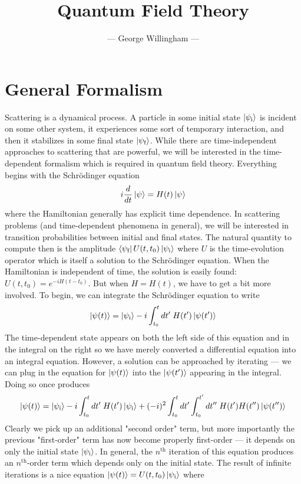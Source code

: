 \documentclass[onecolumn]{gwclass}
\title{Quantum Field Theory}
\author{--- George Willingham ---}
\date{}
\renewcommand{\t}[1]{\text{#1}}
\begin{document}
\maketitle

\tableofcontents 

\section{General Formalism}
Scattering is a dynamical process. A particle in some initial state $\ket{\psi_\t{i}}$ is incident on some other system, it experiences some sort of temporary interaction, and then it stabilizes in some final state $\ket{\psi_\t{f}}$. While there are time-independent approaches to scattering that are powerful, we will be interested in the time-dependent formalism which is required in quantum field theory. Everything begins with the Schr\"odinger equation
$$ i\frac{d}{dt}\ket{\psi} = H(t)\ket{\psi} $$
where the Hamiltonian generally has explicit time dependence. In scattering problems (and time-dependent phenomena in general), we will be interested in transition probabilities between initial and final states. The natural quantity to compute then is the amplitude $\bra{\psi_\t{f}}U(t, t_0)\ket{\psi_\t{i}}$ where $U$ is the time-evolution operator which is itself a solution to the Schr\"odinger equation. When the Hamiltonian is independent of time, the solution is easily found: $U(t, t_0) = e^{-i H (t-t_0)}$. But when $H=H(t)$, we have to get a bit more involved. To begin, we can integrate the Schr\"odinger equation to write
$$ \ket{\psi(t)} = \ket{\psi_\t{i}} - i \int_{t_0}^{t} dt'\;H(t')\ket{\psi(t')} $$
The time-dependent state appears on both the left side of this equation and in the integral on the right so we have merely converted a differential equation into an integral equation. However, a solution can be approached by iterating --- we can plug in the equation for $\ket{\psi(t)}$ into the $\ket{\psi(t')}$ appearing in the integral. Doing so once produces
$$ \ket{\psi(t)} = \ket{\psi_\t{i}} - i\int_{t_0}^t dt'\;H(t')\ket{\psi_\t{i}} +  (-i)^2 \int_{t_0}^t dt'\int_{t_0}^{t'}dt''\;H(t')H(t'')\ket{\psi(t'')}$$
Clearly we pick up an additional "second order" term, but more importantly the previous "first-order" term has now become properly first-order --- it depends on only the initial state $\ket{\psi_\t{i}}$. In general, the $n^\t{th}$ iteration of this equation produces an $n^\t{th}$-order term which depends only on the initial state. The result of infinite iterations is a nice equation $\ket{\psi(t)}= U(t,t_0)\ket{\psi_\t{i}}$ where
\end{document}
